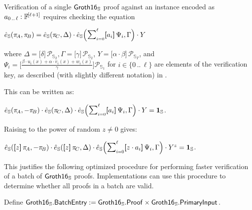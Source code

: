 \documentclass{article}
\newcommand{\typecolon}{:}
\newcommand{\Field}[1]{\mathbb{F}_{\!#1}}
\newcommand{\typeexp}[2]{{#1}\vphantom{)}^{[{#2}]}}
\newcommand{\setof}[1]{\{{#1}\}}
\newcommand{\barerange}[2]{{{#1}\,..\,{#2}}}
\newcommand{\range}[2]{\setof{\barerange{#1}{#2}}}
\newcommand{\sop}[3]{\!\scalebox{0.89}{$\scalebox{1.404}{$\strut#3$}_{#1}^{#2}$}}
\newcommand{\ssum}[2]{\sop{#1}{#2}{\sum}}
\newcommand{\mult}{\cdot}
\newcommand{\scalarmult}[2]{\boldsymbol{[}{#1}\boldsymbol{]}\,{#2}}
\newcommand{\Bigscalarmult}[2]{\Big[{#1}\Big]{#2}}
\newcommand{\Groth}{\mathsf{Groth16}}
\newcommand{\GrothS}{\Groth_{\kern 0.05em\mathbb{S}}}
\newcommand{\GrothSProof}{\GrothS\mathsf{.Proof}}
\newcommand{\GrothSPrimaryInput}{\GrothS\mathsf{.PrimaryInput}}
\newcommand{\GrothSBatchEntry}{\GrothS\mathsf{.BatchEntry}}
\newcommand{\Proof}[1]{\pi_{\!{#1}}}
\newcommand{\Generator}{\mathcal{P}}
\newcommand{\ParamS}[1]{{{#1}_\mathbb{\hskip 0.03em S}}}
\newcommand{\GroupS}[1]{\mathbb{S}_{#1}}
\newcommand{\OneS}{\ParamS{\mathbf{1}}}
\newcommand{\GenS}[1]{\Generator_{\GroupS{#1}}}
\newcommand{\PairingS}{\ParamS{\hat{e}}}
\begin{document}
Verification of a single $\GrothS$ proof against an instance encoded as $a_{\barerange{0}{\ell}} \typecolon \typeexp{\Field{}}{\ell+1}$
requires checking the equation
\vspace{-0.5ex}
\begin{formulae}
  \item $\PairingS(\Proof{A}, \Proof{B}) = \PairingS(\Proof{C}, \Delta) \mult
                                           \PairingS\Big(\ssum{i=0}{\ell}{\scalarmult{a_i}{\Psi_i}}, \Gamma\Big) \mult Y$
\end{formulae}
\vspace{-1ex}
where $\Delta = \scalarmult{\delta}{\GenS{2}}, \Gamma = \scalarmult{\gamma}{\GenS{2}}$, $Y = \scalarmult{\alpha \mult \beta}{\GenS{T}}$,
and $\Psi_i = \Bigscalarmult{\frac{\beta \mult u_i(x) + \alpha \mult v_i(x) + w_i(x)}{\gamma}}{\GenS{1}}$
for $i \in \range{0}{\ell}$ are elements of the verification key, as described (with slightly different notation)
in \cite[section 3.2]{Groth2016}.

This can be written as:
\begin{formulae}
  \item $\PairingS(\Proof{A}, -\Proof{B}) \mult \PairingS(\Proof{C}, \Delta) \mult
         \PairingS\Big(\ssum{i=0}{\ell}{\scalarmult{a_i}{\Psi_i}}, \Gamma\Big) \mult Y = \OneS$.
\end{formulae}

Raising to the power of random $z \neq 0$ gives:
\begin{formulae}
  \item $\PairingS(\scalarmult{z}{\Proof{A}}, -\Proof{B}) \mult \PairingS(\scalarmult{z}{\Proof{C}}, \Delta) \mult
         \PairingS\Big(\ssum{i=0}{\ell}{\scalarmult{z \mult a_i}{\Psi_i}}, \Gamma\Big) \mult Y^z = \OneS$.
\end{formulae}

This justifies the following optimized procedure for performing faster verification of a batch of $\GrothS$ proofs.
Implementations can use this procedure to determine whether all proofs in a batch are valid.

Define $\GrothSBatchEntry := \GrothSProof \times \GrothSPrimaryInput$.
\end{document}
